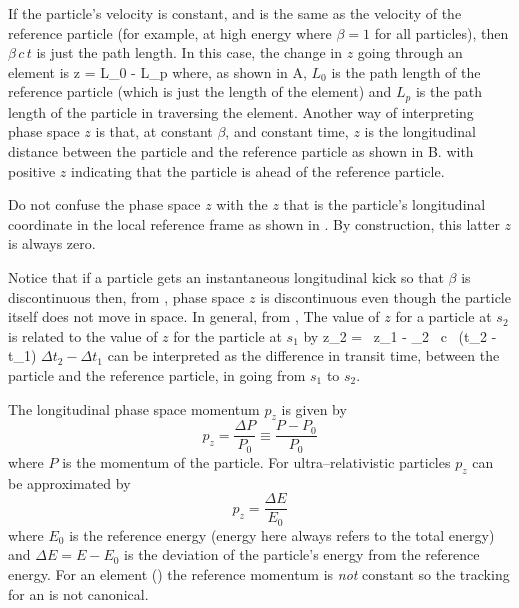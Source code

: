 If the particle's velocity is constant, and is
the same as the velocity of the reference particle (for example, at
high energy where $\beta = 1$ for all particles), then $\beta \, c \,
t$ is just the path length. In this case, the change in $z$ going
through an element is
\Begineq
  \Delta z = L_0 - L_p
\Endeq
where, as shown in A, $L_0$ is the path
length of the reference particle (which is just the length of the
element) and $L_p$ is the path length of the particle in traversing
the element.  Another way of interpreting phase space $z$ is that, at
constant $\beta$, and constant time, $z$ is the longitudinal distance
between the particle and the reference particle as shown in
B. with positive $z$ indicating that the
particle is ahead of the reference particle.

Do not confuse the phase space $z$ with the $z$ that is the particle's
longitudinal coordinate in the local reference frame as shown in
. By construction, this latter $z$ is
always zero.

Notice that if a particle gets an instantaneous longitudinal kick so
that $\beta$ is discontinuous then, from , phase space $z$ is
discontinuous even though the particle itself does not move in
space. In general, from , The value of $z$ for a particle at
$s_2$ is related to the value of $z$ for the particle at $s_1$ by
\Begineq
  z_2 =  \, z_1 - 
  \beta_2 \, c \, (\Delta t_2 - \Delta t_1)
  \label{zbbzb}
\Endeq
$\Delta t_2 - \Delta t_1$ can be interpreted as the difference in
transit time, between the particle and the reference particle, in going
from $s_1$ to $s_2$.

The longitudinal phase space momentum $p_z$ is given by
\begin{equation}
  p_z = \frac{\Delta P}{P_0} \equiv \frac{P - P_0}{P_0}
  \label{ppppp}
\end{equation}
where $P$ is the momentum of the particle. For ultra--relativistic particles
$p_z$ can be approximated by
\begin{equation}
  p_z = \frac{\Delta E}{E_0}
\end{equation}
where $E_0$ is the reference energy (energy here always refers to the
total energy) and $\Delta E = E - E_0$ is the deviation of the
particle's energy from the reference energy. For an 
element () the reference momentum is {\it not} constant
so the tracking for an  is not canonical.

